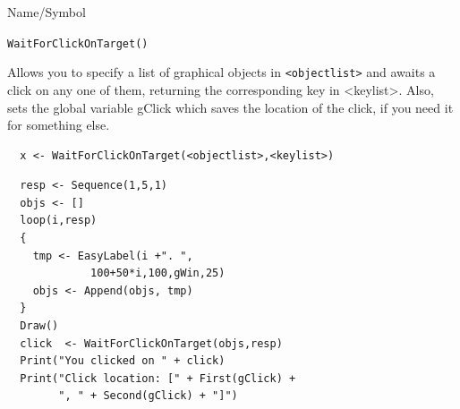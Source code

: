 \begin{desc}{Name/Symbol}
\item[Name/Symbol]  	\verb+WaitForClickOnTarget()+

\item[Description]	
  Allows you to specify a list of graphical objects in \verb+<objectlist>+ and awaits a click
  on any one of them, returning the corresponding key in <keylist>.  Also, sets the 
  global variable gClick which saves the location of the click, if 
  you need it for something else.
\item[Usage]		
\begin{verbatim}
  x <- WaitForClickOnTarget(<objectlist>,<keylist>)
\end{verbatim}

\item[Example]	

\begin{verbatim}
  resp <- Sequence(1,5,1)
  objs <- []
  loop(i,resp)
  {
    tmp <- EasyLabel(i +". ",
             100+50*i,100,gWin,25)
    objs <- Append(objs, tmp)
  }
  Draw()
  click  <- WaitForClickOnTarget(objs,resp)
  Print("You clicked on " + click)
  Print("Click location: [" + First(gClick) + 
        ", " + Second(gClick) + "]")
\end{verbatim}
\item[See Also]	
\end{desc}




